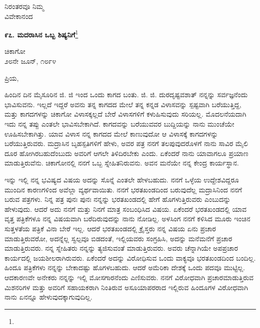 {\flushright
ನಿರಂತರವೂ ನಿಮ್ಮ\\ವಿವೇಕಾನಂದ\par}

\begin{center}
\textbf{೯೭. ಮದರಾಸಿನ ಒಬ್ಬ ಶಿಷ್ಯನಿಗೆ}\footnote{}
\end{center}

\begin{flushright}
ಚಿಕಾಗೋ\\೨೮ನೇ ಜೂನ್, ೧೮೯೪
\end{flushright}

\noindent
ಪ್ರಿಯ,

ಹಿಂದಿನ ದಿನ ಮೈಸೂರಿನ ಜಿ. ಜಿ ಇಂದ ಒಂದು ಕಾಗದ ಬಂತು. ಜಿ. ಜಿ. ದುರದೃಷ್ಟವಶಾತ್ ನನ್ನನ್ನು ಸರ್ವಜ್ಞನೆಂದು ಭಾವಿಸುವನು. ಇಲ್ಲದೆ ಇದ್ದರೆ ಅವನು ತನ್ನ ಕಾಗದದ ಮೇಲೆ ತನ್ನ ಕನ್ನಡ ವಿಳಾಸವನ್ನು ಸ್ಪಷ್ಟವಾಗಿ ಬರೆಯುತ್ತಿದ್ದ, ಮತ್ತು ಕಾಗದಗಳನ್ನು ಚಿಕಾಗೋ ವಿಳಾಸಕ್ಕಲ್ಲದೆ ಬೇರೆ ವಿಳಾಸಗಳಿಗೆ ಕಳುಹಿಸುವುದು ಸರಿಯಲ್ಲ. ಮೊದಲನೆಯದಾಗಿ ಇದು ನನ್ನ ತಪ್ಪು ಎಂತಲೇ ಭಾವಿಸಬೇಕಾಗಿದೆ. ಕಾಗದವನ್ನು ಬರೆಯುವವರ ಬುದ್ದಿಯನ್ನು ನಾನು ಮುಂಚೆಯೇ ಊಹಿಸಬೇಕಾಗಿತ್ತು. ಯಾವ ವಿಳಾಸ ನನ್ನ ಕಾಗದದ ಮೇಲೆ ಕಾಣುವುದೋ ಆ ವಿಳಾಸಕ್ಕೆ ಕಾಗದಗಳನ್ನು ಬರೆಯುತ್ತಿರುವರು. ಮದ್ರಾಸಿನ ಬೃಹಸ್ಪತಿಗಳಿಗೆ ಹೇಳು, ಅವರ ಪತ್ರ ನನಗೆ ತಲಪುವುದರೊಳಗೆ ನಾನು ಸಾವಿರ ಮೈಲಿ ದೂರ ಹೋಗಿರಬಹುದೆಂಬುದು ಅವರಿಗೆ ಆಗಲೇ ತಿಳಿದಿರಬೇಕು ಎಂದು. ಏಕೆಂದರೆ ನಾನು ಯಾವಾಗಲೂ ಪ್ರಯಾಣ ಮಾಡುತ್ತಿರುವೆನು. ಚಿಕಾಗೋನಲ್ಲಿ ನನಗೆ ಒಬ್ಬ ಸ್ನೇಹಿತನಿರುವನು. ಅವನ ಮನೆಯೇ ನನ್ನ ಕೇಂದ್ರ ಕಾರ್ಯಸ್ಥಾನ.

ಇನ್ನು ಇಲ್ಲಿ ನನ್ನ ಭವಿಷ್ಯದ ವಿಷಯ \enginline{-} ಅದನ್ನು ಸೊನ್ನೆ ಎಂತಲೇ ಹೇಳಬಹುದು. ನನಗೆ ಒಳ್ಳೆಯ ಉದ್ದೇಶವಿದ್ದರೂ ಮುಂದಿನ ಕಾರಣಗಳಿಂದ ಅವೆಲ್ಲಾ ವ್ಯರ್ಥವಾಯಿತು. ನನಗೆ ಭರತಖಂಡದಿಂದ ಬರುವುದೆಲ್ಲ ಮದ್ರಾಸಿನಿಂದ ನನಗೆ ಬರುವ ಪತ್ರಗಳು. ನಿನ್ನ ಪತ್ರ ಪುನಃ ಪುನಃ ನನ್ನನ್ನು ಭರತಖಂಡದಲ್ಲಿ ಹೇಗೆ ಹೊಗಳುತ್ತಿರುವರು ಎಂಬುದನ್ನು ಹೇಳುವುದು. ಆದರೆ ಅದು ನನಗೆ ಮತ್ತು ನಿನಗೆ ಮಾತ್ರ ಸಂಬಂಧಿಸಿದ ವಿಷಯ. ಏಕೆಂದರೆ ಭರತಖಂಡದಲ್ಲಿ ಯಾವ ವೃತ್ತ ಪತ್ರಿಕೆಗಳೂ ನನ್ನ ವಿಷಯವಾಗಿ ಬರೆದಿರುವುದನ್ನು ನಾನು ನೋಡಿಲ್ಲ. ಅಳಸಿಂಗ ನನಗೆ ಕಳಿಸಿದ ಮೂರು ಇಂಚಿನ ಸುತ್ತಳತೆಯ ಪತ್ರಿಕೆ ವಿನಾ ಬೇರೆ ಇಲ್ಲ. ಆದರೆ ಭರತಖಂಡದಲ್ಲಿ ಕ್ರೈಸ್ತರು ನನ್ನ ವಿಷಯ ಏನು ಪ್ರಚಾರ ಮಾಡುತ್ತಿರುವರೋ, ಅದನ್ನೆಲ್ಲ ಸ್ವಲ್ಪವೂ ಬಿಡದಂತೆ, ಇಲ್ಲಿಯವರು ಸಂಗ್ರಹಿಸಿ, ಅದನ್ನು ಮನೆಮನೆಗೆ ಪ್ರಚಾರ ಮಾಡುತ್ತಿರುವರು. ನನ್ನ ಸ್ನೇಹಿತರು ನನ್ನನ್ನು ತ್ಯಜಿಸುವಂತೆ ಮಾಡುತ್ತಿರುವರು. ಅವರು ಚೆನ್ನಾಗಿಯೇ ಅಪಪ್ರಚಾರ ಕಾರ್ಯದಲ್ಲಿ ಜಯಶೀಲರಾಗಿರುವರು. ಏಕೆಂದರೆ ಅದನ್ನು ವಿರೋಧಿಸುವ ಒಂದು ವಾಕ್ಯವೂ ಭರತಖಂಡದಿಂದ ಬಂದಿಲ್ಲ. ಹಿಂದೂ ಪತ್ರಿಕೆಗಳು ನನ್ನನ್ನು ಬೇಕಾದಷ್ಟು ಹೊಗಳಬಹುದು. ಆದರೆ ಅಮೆರಿಕಾ ದೇಶಕ್ಕೆ ಒಂದು ಪದವೂ ಮುಟ್ಟಿಲ್ಲ. ಆದಕಾರಣವೇ ಅನೇಕರು ನನ್ನನ್ನು ಇಲ್ಲಿ ಮೋಸಗಾರನೆಂದು ಎಣಿಸುವರು. ನನಗೆ ವಿರೋಧವಾಗಿ ಪ್ರಚಾರಮಾಡುತ್ತಿರುವ ಮಿಶನರಿಗಳ ಮತ್ತು ಅವರಿಗೆ ಸಹಾಯಕರಾಗಿ ನಿಂತಿರುವ ಅಸೂಯಾಪರರಾದ ಇಲ್ಲಿರುವ ಹಿಂದೂಗಳ ವಿರೋಧವಾಗಿ ನಾನು ಏನನ್ನೂ ಹೇಳುವುದಕ್ಕಾಗುವುದಿಲ್ಲ.

